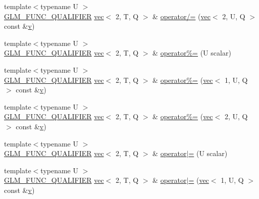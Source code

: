 \begin{DoxyCompactItemize}
{\footnotesize template$<$typename U $>$ }\\\mbox{\hyperlink{setup_8hpp_a33fdea6f91c5f834105f7415e2a64407}{G\+L\+M\+\_\+\+F\+U\+N\+C\+\_\+\+Q\+U\+A\+L\+I\+F\+I\+ER}} \mbox{\hyperlink{structglm_1_1vec}{vec}}$<$ 2, T, Q $>$ \& \mbox{\hyperlink{structglm_1_1vec_3_012_00_01_t_00_01_q_01_4_aad3c8d0a01f1f7b325d450ecd7641e55}{operator/=}} (\mbox{\hyperlink{structglm_1_1vec}{vec}}$<$ 2, U, Q $>$ const \&\mbox{\hyperlink{_s_d_l__opengl_8h_a10a82eabcb59d2fcd74acee063775f90}{v}})
\item 
{\footnotesize template$<$typename U $>$ }\\\mbox{\hyperlink{setup_8hpp_a33fdea6f91c5f834105f7415e2a64407}{G\+L\+M\+\_\+\+F\+U\+N\+C\+\_\+\+Q\+U\+A\+L\+I\+F\+I\+ER}} \mbox{\hyperlink{structglm_1_1vec}{vec}}$<$ 2, T, Q $>$ \& \mbox{\hyperlink{structglm_1_1vec_3_012_00_01_t_00_01_q_01_4_a48f3476d27c4527802ddd58aa7762f64}{operator\%=}} (U scalar)
\item 
{\footnotesize template$<$typename U $>$ }\\\mbox{\hyperlink{setup_8hpp_a33fdea6f91c5f834105f7415e2a64407}{G\+L\+M\+\_\+\+F\+U\+N\+C\+\_\+\+Q\+U\+A\+L\+I\+F\+I\+ER}} \mbox{\hyperlink{structglm_1_1vec}{vec}}$<$ 2, T, Q $>$ \& \mbox{\hyperlink{structglm_1_1vec_3_012_00_01_t_00_01_q_01_4_a267102cc597898b31585143684c70530}{operator\%=}} (\mbox{\hyperlink{structglm_1_1vec}{vec}}$<$ 1, U, Q $>$ const \&\mbox{\hyperlink{_s_d_l__opengl_8h_a10a82eabcb59d2fcd74acee063775f90}{v}})
\item 
{\footnotesize template$<$typename U $>$ }\\\mbox{\hyperlink{setup_8hpp_a33fdea6f91c5f834105f7415e2a64407}{G\+L\+M\+\_\+\+F\+U\+N\+C\+\_\+\+Q\+U\+A\+L\+I\+F\+I\+ER}} \mbox{\hyperlink{structglm_1_1vec}{vec}}$<$ 2, T, Q $>$ \& \mbox{\hyperlink{structglm_1_1vec_3_012_00_01_t_00_01_q_01_4_a28092b816bf44c13025e22c1cdf53d68}{operator\%=}} (\mbox{\hyperlink{structglm_1_1vec}{vec}}$<$ 2, U, Q $>$ const \&\mbox{\hyperlink{_s_d_l__opengl_8h_a10a82eabcb59d2fcd74acee063775f90}{v}})
\item 
{\footnotesize template$<$typename U $>$ }\\\mbox{\hyperlink{setup_8hpp_a33fdea6f91c5f834105f7415e2a64407}{G\+L\+M\+\_\+\+F\+U\+N\+C\+\_\+\+Q\+U\+A\+L\+I\+F\+I\+ER}} \mbox{\hyperlink{structglm_1_1vec}{vec}}$<$ 2, T, Q $>$ \& \mbox{\hyperlink{structglm_1_1vec_3_012_00_01_t_00_01_q_01_4_acc0ff197f7484a80cfb27a71365d9756}{operator$\vert$=}} (U scalar)
\item 
{\footnotesize template$<$typename U $>$ }\\\mbox{\hyperlink{setup_8hpp_a33fdea6f91c5f834105f7415e2a64407}{G\+L\+M\+\_\+\+F\+U\+N\+C\+\_\+\+Q\+U\+A\+L\+I\+F\+I\+ER}} \mbox{\hyperlink{structglm_1_1vec}{vec}}$<$ 2, T, Q $>$ \& \mbox{\hyperlink{structglm_1_1vec_3_012_00_01_t_00_01_q_01_4_ae4060ed77226e8669a00d6511f61eab3}{operator$\vert$=}} (\mbox{\hyperlink{structglm_1_1vec}{vec}}$<$ 1, U, Q $>$ const \&\mbox{\hyperlink{_s_d_l__opengl_8h_a10a82eabcb59d2fcd74acee063775f90}{v}})

\end{DoxyCompactItemize}
